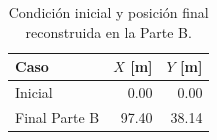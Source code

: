 \begin{table}[H]
\centering
\caption{Condición inicial y posición final reconstruida en la Parte B.}
\label{tab:parte-b-posicion}
\begin{tabular}{lrr}
\toprule
Caso & $X$ [m] & $Y$ [m] \\
\midrule
Inicial & 0.00 & 0.00 \\
Final Parte B & 97.40 & 38.14 \\
\bottomrule
\end{tabular}
\end{table}

